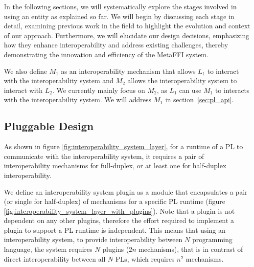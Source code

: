 \documentclass[sigplan,10pt,manuscript,nonacm]{acmart}
\begin{document}
In the following sections, we will systematically explore the stages involved in using an entity as explained so far. We will begin by discussing each stage in detail, examining previous work in the field to highlight the evolution and context of our approach. Furthermore, we will elucidate our design decisions, emphasizing how they enhance interoperability and address existing challenges, thereby demonstrating the innovation and efficiency of the MetaFFI system.

We also define $M_1$ as an interoperability mechanism that allows $L_1$ to interact with the interoperability system and $M_2$ allows the interoperability system to interact with $L_2$. We currently mainly focus on $M_2$, as $L_1$ can use $M_1$ to interacts with the interoperability system. We will address $M_1$ in section~\ref{sec:pl_api}.

\subsection{Pluggable Design} \label{sec:pluggable_design}
As shown in figure \ref{fig:interoperability_system_layer}, for a runtime of a PL to communicate with the interoperability system, it requires a pair of interoperability mechanisms for full-duplex, or at least one for half-duplex interoperability.

We define an interoperability system plugin as a module that encapsulates a pair (or single for half-duplex) of mechanisms for a specific PL runtime (figure \ref{fig:interoperability_system_layer_with_plugins}). Note that a plugin is not dependent on any other plugins, therefore the effort required to implement a plugin to support a PL runtime is independent. This means that using an interoperability system, to provide interoperability between $N$ programming language, the system requires $N$ plugins ($2n$ mechanisms), that is in contrast of direct interoperability between all $N$ PLs, which requires $n^2$ mechanisms.
\end{document}
